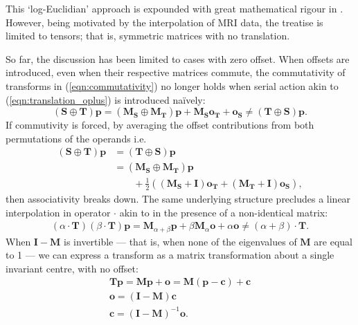         This `log-Euclidian' approach is expounded with great mathematical rigour in \cite{Arsigny2005}. However, being motivated by the interpolation of MRI data, the treatise is limited to tensors; that is, symmetric matrices with no translation.
        
		    So far, the discussion has been limited to cases with zero offset. When offsets are introduced, even when their respective matrices commute, the commutativity of transforms in (\ref{eqn:commutativity}) no longer holds when serial action akin to (\ref{eqn:translation_oplus}) is introduced na\"ively:
        \begin{equation}
          (\mathbf{S} \oplus \mathbf{T})\mathbf{p} = (\mathbf{M_S} \oplus \mathbf{M_T})\mathbf{p} + \mathbf{M_So_T} + \mathbf{o_S} \ne (\mathbf{T} \oplus \mathbf{S})\mathbf{p}.
        \end{equation}
        If commutivity is forced, by averaging the offset contributions from both permutations of the operands i.e.
        \begin{equation}
            \begin{split}
                (\mathbf{S} \oplus \mathbf{T})\mathbf{p} &= (\mathbf{T} \oplus \mathbf{S})\mathbf{p} \\
                                                         &= (\mathbf{M_S} \oplus \mathbf{M_T})\mathbf{p} \\
                                                         &\qquad + \frac{1}{2}\left(\left( \mathbf{M_S} + \mathbf{I} \right) \mathbf{o_T} + \left( \mathbf{M_T} + \mathbf{I} \right)\mathbf{o_S}\right),
            \end{split}
        \end{equation}
        then associativity breaks down. The same underlying structure precludes a linear interpolation in operator $\cdot$ akin to  in the presence of a non-identical matrix:
        \begin{gather}
            (\alpha \cdot \mathbf{T})(\beta \cdot \mathbf{T})\mathbf{p} = \mathbf{M}_{\alpha+\beta}\mathbf{p} + \beta\mathbf{M}_{\alpha}\mathbf{o} + \alpha\mathbf{o} \ne (\alpha + \beta) \cdot \mathbf{T}.
        \end{gather}
        When $\mathbf{I} - \mathbf{M}$ is invertible --- that is, when none of the eigenvalues of $\mathbf{M}$ are equal to 1 --- we can express a transform as a matrix transformation about a single invariant centre, with no offset:
        \begin{gather}
          \mathbf{Tp} = \mathbf{Mp} + \mathbf{o} = \mathbf{M}(\mathbf{p}-\mathbf{c}) + \mathbf{c} \\
          \mathbf{o} = (\mathbf{I} - \mathbf{M})\mathbf{c} \\
          \mathbf{c} = (\mathbf{I} - \mathbf{M})^{-1}\mathbf{o}.
        \end{gather}
